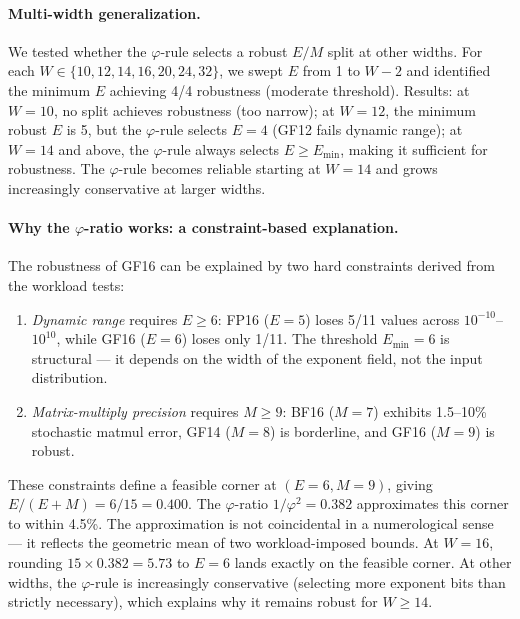 \documentclass[11pt]{article}
\begin{document}
\paragraph{Multi-width generalization.}
We tested whether the $\varphi$-rule selects a robust $E/M$ split at
other widths. For each $W \in \{10, 12, 14, 16, 20, 24, 32\}$, we
swept $E$ from 1 to $W{-}2$ and identified the minimum $E$ achieving
4/4 robustness (moderate threshold). Results: at $W{=}10$, no split
achieves robustness (too narrow); at $W{=}12$, the minimum robust $E$
is 5, but the $\varphi$-rule selects $E{=}4$ (GF12 fails dynamic
range); at $W{=}14$ and above, the $\varphi$-rule always selects
$E \geq E_{\min}$, making it sufficient for robustness. The
$\varphi$-rule becomes reliable starting at $W{=}14$ and grows
increasingly conservative at larger widths.

\paragraph{Why the $\varphi$-ratio works: a constraint-based explanation.}
The robustness of GF16 can be explained by two hard constraints
derived from the workload tests:
\begin{enumerate}
\item \emph{Dynamic range} requires $E \geq 6$: FP16 ($E{=}5$) loses
  5/11 values across $10^{-10}$--$10^{10}$, while GF16 ($E{=}6$)
  loses only 1/11. The threshold $E_{\min}{=}6$ is structural ---
it depends on the width of the exponent field, not the input distribution.
\item \emph{Matrix-multiply precision} requires $M \geq 9$: BF16
  ($M{=}7$) exhibits 1.5--10\% stochastic matmul error, GF14
  ($M{=}8$) is borderline, and GF16 ($M{=}9$) is robust.
\end{enumerate}
These constraints define a feasible corner at $(E{=}6, M{=}9)$, giving
$E/(E{+}M) = 6/15 = 0.400$. The $\varphi$-ratio $1/\varphi^2 = 0.382$
approximates this corner to within 4.5\%. The approximation is not
coincidental in a numerological sense --- it reflects the geometric
mean of two workload-imposed bounds. At $W{=}16$, rounding
$15 \times 0.382 = 5.73$ to $E{=}6$ lands exactly on the feasible
corner. At other widths, the $\varphi$-rule is increasingly
conservative (selecting more exponent bits than strictly necessary),
which explains why it remains robust for $W \geq 14$.
\end{document}

